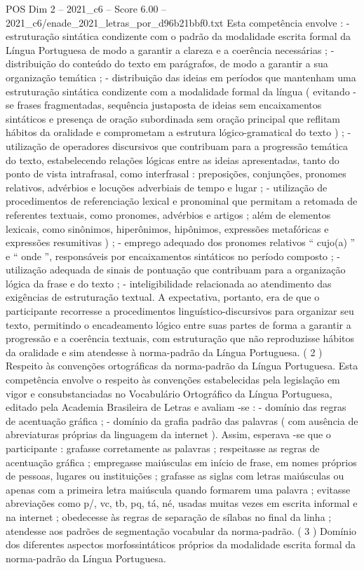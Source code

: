 \begin{textsample}{POS Dim 2 – 2021\_c6 – Score 6.00 – 2021\_c6/enade\_2021\_letras\_por\_d96b21bbf0.txt}
Esta competência envolve : - estruturação sintática condizente com o padrão da modalidade escrita formal da Língua Portuguesa de modo a garantir a clareza e a coerência necessárias ; - distribuição do conteúdo do texto em parágrafos, de modo a garantir a sua organização temática ; - distribuição das ideias em períodos que mantenham uma estruturação sintática condizente com a modalidade formal da língua ( evitando -se frases fragmentadas, sequência justaposta de ideias sem encaixamentos sintáticos e presença de oração subordinada sem oração principal que reflitam hábitos da oralidade e comprometam a estrutura lógico-gramatical do texto ) ; - utilização de operadores discursivos que contribuam para a progressão temática do texto, estabelecendo relações lógicas entre as ideias apresentadas, tanto do ponto de vista intrafrasal, como interfrasal : preposições, conjunções, pronomes relativos, advérbios e locuções adverbiais de tempo e lugar ; - utilização de procedimentos de referenciação lexical e pronominal que permitam a retomada de referentes textuais, como pronomes, advérbios e artigos ; além de elementos lexicais, como sinônimos, hiperônimos, hipônimos, expressões metafóricas e expressões resumitivas ) ; - emprego adequado dos pronomes relativos “ cujo(a) ” e “ onde ”, responsáveis por encaixamentos sintáticos no período composto ; - utilização adequada de sinais de pontuação que contribuam para a organização lógica da frase e do texto ; - inteligibilidade relacionada ao atendimento das exigências de estruturação textual.
A expectativa, portanto, era de que o participante recorresse a procedimentos linguístico-discursivos para organizar seu texto, permitindo o encadeamento lógico entre suas partes de forma a garantir a progressão e a coerência textuais, com estruturação que não reproduzisse hábitos da oralidade e sim atendesse à norma-padrão da Língua Portuguesa. ( 2 ) Respeito às convenções ortográficas da norma-padrão da Língua Portuguesa.
Esta competência envolve o respeito às convenções estabelecidas pela legislação em vigor e consubstanciadas no Vocabulário Ortográfico da Língua Portuguesa, editado pela Academia Brasileira de Letras e avaliam -se : - domínio das regras de acentuação gráfica ; - domínio da grafia padrão das palavras ( com ausência de abreviaturas próprias da linguagem da internet ).
Assim, esperava -se que o participante : grafasse corretamente as palavras ; respeitasse as regras de acentuação gráfica ; empregasse maiúsculas em início de frase, em nomes próprios de pessoas, lugares ou instituições ; grafasse as siglas com letras maiúsculas ou apenas com a primeira letra maiúscula quando formarem uma palavra ; evitasse abreviações como p/, vc, tb, pq, tá, né, usadas muitas vezes em escrita informal e na internet ; obedecesse às regras de separação de sílabas no final da linha ; atendesse aos padrões de segmentação vocabular da norma-padrão. ( 3 ) Domínio dos diferentes aspectos morfossintáticos próprios da modalidade escrita formal da norma-padrão da Língua Portuguesa.

\end{textsample}
